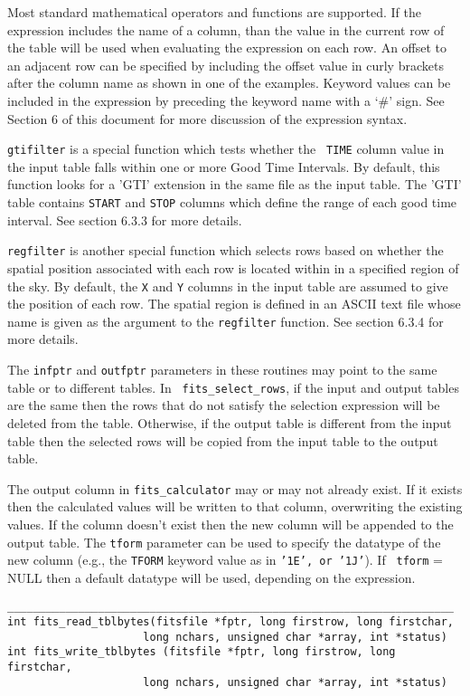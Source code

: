 \documentclass[11pt]{article}
\begin{document}
Most standard mathematical operators and functions are supported.  If
the expression includes the name of a column, than the value in the
current row of the table will be used when evaluating the expression on
each row.   An offset to an adjacent row can be specified by including
the offset value in curly brackets after the column name as shown in
one of the examples.  Keyword values can be included in the expression
by preceding the keyword name with a `\#' sign.   See Section 6 of this
document for more discussion of the expression syntax.

{\tt gtifilter} is a special function which tests whether the {\tt
TIME} column value in the input table falls within one or more Good
Time Intervals.  By default, this function looks for a 'GTI' extension
in the same file as the input table.  The 'GTI' table contains {\tt START} and {\tt STOP} columns which define the range of
each good time interval. See section 6.3.3 for more details.

{\tt regfilter} is another special function which selects rows based on
whether the spatial position associated with each row is located within
in a specified region of the sky.  By default, the {\tt X} and {\tt Y}
columns in the input table are assumed to give the position of each row.
The spatial region is defined in an ASCII text file whose name is given
as the argument to the {\tt regfilter} function. See section 6.3.4 for
more details.

The {\tt infptr} and {\tt outfptr} parameters in these routines may
point to the same table or to different tables.  In {\tt
fits\_select\_rows}, if the input and output tables are the same then
the rows that do not satisfy the selection expression will be deleted
from the table.  Otherwise, if the output table is different from the
input table then the selected rows will be copied from the input table
to the output table.

The output column in {\tt fits\_calculator} may or may not already
exist.  If it exists then the calculated values will be written to that
column, overwriting the existing values.  If the column doesn't exist
then the new column will be appended to the output table. The {\tt tform}
parameter can be used to specify the datatype of the new column (e.g.,
the {\tt TFORM} keyword value as in {\tt '1E', or '1J'}). If {\tt
tform} = NULL then a default datatype will be used, depending on the
expression.

\begin{verbatim}
_____________________________________________________________________
int fits_read_tblbytes(fitsfile *fptr, long firstrow, long firstchar,
                     long nchars, unsigned char *array, int *status)
int fits_write_tblbytes (fitsfile *fptr, long firstrow, long firstchar,
                     long nchars, unsigned char *array, int *status)
\end{verbatim}
\end{document}
